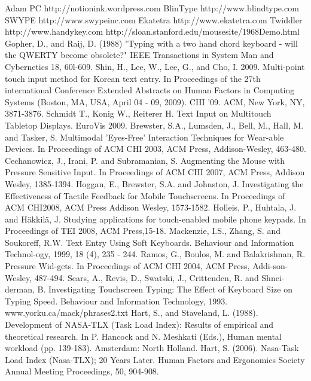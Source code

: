 \documentclass{chi2011}
\begin{document}
%
















\begin{thebibliography}{1}
 Adam PC http://notionink.wordpress.com
 BlinType http://www.blindtype.com
 SWYPE http://www.swypeinc.com
 Ekatetra http://www.ekatetra.com
 Twiddler http://www.handykey.com
 http://sloan.stanford.edu/mousesite/1968Demo.html
 Gopher, D., and Raij, D. (1988) "Typing with a two hand chord keyboard - will the QWERTY become obsolete?" IEEE Transactions in System Man and Cybernetics 18, 60l-609. 
 Shin, H., Lee, W., Lee, G., and Cho, I. 2009. Multi-point touch input method for Korean text entry. In Proceedings of the 27th international Conference Extended Abstracts on Human Factors in Computing Systems (Boston, MA, USA, April 04 - 09, 2009). CHI '09. ACM, New York, NY, 3871-3876.
 Schmidt T., Konig W., Reiterer H. Text Input on Multitouch Tabletop Displays. EuroVis 2009.
 Brewster, S.A., Lumsden, J., Bell, M., Hall, M. and Tasker, S. Multimodal 'Eyes-Free' Interaction Techniques for Wear-able Devices. In Proceedings of ACM CHI 2003, ACM Press, Addison-Wesley, 463-480.
 Cechanowicz, J., Irani, P. and Subramanian, S. Augmenting the Mouse with Pressure Sensitive Input. In Proceedings of ACM CHI 2007, ACM Press, Addison Wesley, 1385-1394.
 Hoggan, E., Brewster, S.A. and Johnston, J. Investigating the Effectiveness of Tactile Feedback for Mobile Touchscreens. In Proceedings of ACM CHI2008, ACM Press Addison Wesley, 1573-1582.
 Holleis, P., Huhtala, J. and Häkkilä, J. Studying applications for touch-enabled mobile phone keypads. In Proceedings of TEI 2008, ACM Press,15-18.
 Mackenzie, I.S., Zhang, S. and Soukoreff, R.W. Text Entry Using Soft Keyboards. Behaviour and Information Technol-ogy, 1999, 18 (4), 235 - 244.
 Ramos, G., Boulos, M. and Balakrishnan, R. Pressure Wid-gets. In Proceedings of ACM CHI 2004, ACM Press, Addi-son-Wesley, 487-494.
 Sears, A., Revis, D., Swatski, J., Crittenden, R. and Shnei-derman, B. Investigating Touchscreen Typing: The Effect of Keyboard Size on Typing Speed. Behaviour and Information Technology, 1993.
 www.yorku.ca/mack/phrases2.txt
 Hart, S., and Staveland, L. (1988). Development of NASA-TLX (Task Load Index): Results of empirical and theoretical research. In P. Hancock and N. Meshkati (Eds.), Human mental workload (pp. 139-183). Amsterdam: North Holland.
 Hart, S. (2006). Nasa-Task Load Index (Nasa-TLX); 20 Years Later. Human Factors and Ergonomics Society Annual Meeting Proceedings, 50, 904-908.
\end{thebibliography}
\end{document}
